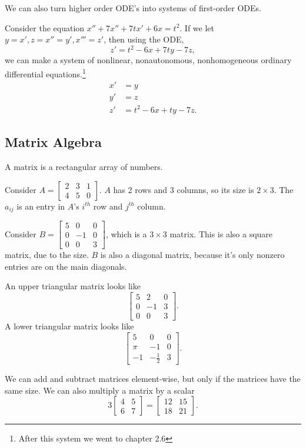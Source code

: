 We can also turn higher order ODE's into systems of first-order ODEs.
\begin{eg}
  Consider the equation $x''+7x''+7tx'+6x=t^2$. If we let $y=x',z=x''=y',x'''=z'$, then using the ODE,
  \[
  z'=t^2-6x+7ty-7z
  ,\]
  we can make a system of nonlinear, nonautonomous, nonhomogeneous ordinary differential equations.\footnote{After this system we went to chapter 2.6}
  \begin{align*}
    x'&=y\\
    y'&=z\\
    z'&=t^2-6x+ty-7z
  .\end{align*}
\subsection{Matrix Algebra}
A matrix is a rectangular array of numbers. 
\begin{eg}
  Consider $A=\begin{bmatrix} 2&3&1\\4&5&0 \end{bmatrix} $. $A$ has 2 rows and 3 columns, so its size is $2\times 3$. The $a_{ij}$ is an entry in $A$'s $i^{th}$ row and $j^{th}$ column.
\end{eg}
\begin{eg}
  Consider $B=\begin{bmatrix} 5&0&0\\0&-1&0\\0&0&3 \end{bmatrix} $, which is a $3\times 3$ matrix. This is also a square matrix, due to the size. $B$ is also a diagonal matrix, because it's only nonzero entries are on the main diagonals.
\end{eg}
An upper triangular matrix looks like 
\[
  \begin{bmatrix} 5&2&0\\0&-1&3\\0&0&3 \end{bmatrix} 
.\] 
A lower triangular matrix looks like
\[
  \begin{bmatrix} 5&0&0\\ \pi&-1&0\\-1&-\frac{1}{2}&3 \end{bmatrix} 
.\] 
\end{eg}
We can add and subtract matrices element-wise, but only if the matrices have the same size. We can also multiply a matrix by a scalar
\[
  3\begin{bmatrix} 4&5\\6&7 \end{bmatrix} =\begin{bmatrix} 12&15\\18&21 \end{bmatrix} 
.\] 
